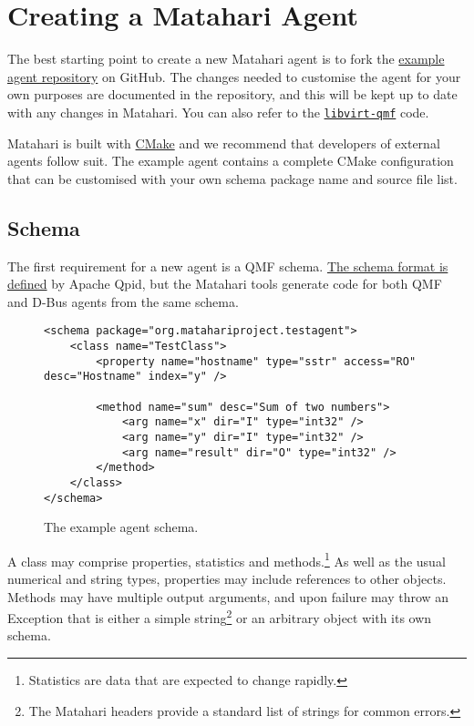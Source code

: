 \section{Creating a Matahari Agent}

The best starting point to create a new Matahari agent is to fork the \href{https://github.com/matahari/matahari-agent-example}{example agent repository} on GitHub. The changes needed to customise the agent for your own purposes are documented in the repository, and this will be kept up to date with any changes in Matahari.
You can also refer to the \href{https://github.com/matahari/libvirt-qmf}{\texttt{libvirt-qmf}} code.

Matahari is built with \href{http://www.cmake.org/}{CMake} and we recommend that developers of external agents follow suit. The example agent contains a complete CMake configuration that can be customised with your own schema package name and source file list.

\subsection{Schema}

The first requirement for a new agent is a QMF schema. \href{https://cwiki.apache.org/qpid/qpid-management-framework.html#QpidManagementFramework-Schema}{The schema format is defined} by Apache Qpid, but the Matahari tools generate code for both QMF and D-Bus agents from the same schema.

\begin{figure}[h]
\begin{Verbatim}
<schema package="org.matahariproject.testagent">
    <class name="TestClass">
        <property name="hostname" type="sstr" access="RO" desc="Hostname" index="y" />

        <method name="sum" desc="Sum of two numbers">
            <arg name="x" dir="I" type="int32" />
            <arg name="y" dir="I" type="int32" />
            <arg name="result" dir="O" type="int32" />
        </method>
    </class>
</schema>
\end{Verbatim}
\caption{The example agent schema.}
\label{fig:schema}
\end{figure}

A class may comprise properties, statistics and methods.\footnote{Statistics are data that are expected to change rapidly.} As well as the usual numerical and string types, properties may include references to other objects.
Methods may have multiple output arguments, and upon failure may throw an Exception that is either a simple string\footnote{The Matahari headers provide a standard list of strings for common errors.} or an arbitrary object with its own schema.

